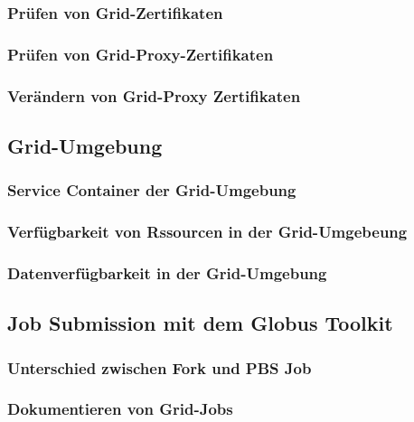 	\subsubsection*{Prüfen von Grid-Zertifikaten}
	\subsubsection*{Prüfen von Grid-Proxy-Zertifikaten}
	\subsubsection*{Verändern von Grid-Proxy Zertifikaten}

\subsection{Grid-Umgebung}
	\subsubsection*{Service Container der Grid-Umgebung}
	\subsubsection*{Verfügbarkeit von Rssourcen in der Grid-Umgebeung}
	\subsubsection*{Datenverfügbarkeit in der Grid-Umgebung}

\subsection{Job Submission mit dem Globus Toolkit}
	\subsubsection*{Unterschied zwischen Fork und PBS Job}
	\subsubsection*{Dokumentieren von Grid-Jobs}

